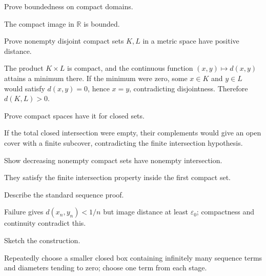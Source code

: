\begin{problem}\label{prob:ii06-problem-05}
Prove boundedness on compact domains.
\end{problem}
\begin{solution}
The compact image in $\mathbb R$ is bounded.
\end{solution}

\begin{problem}\label{prob:ii06-problem-06}
Prove nonempty disjoint compact sets $K,L$ in a metric space have positive distance.
\end{problem}
\begin{solution}
The product $K\times L$ is compact, and the continuous function $(x,y)\mapsto d(x,y)$ attains a minimum there. If the minimum were zero, some $x\in K$ and $y\in L$ would satisfy $d(x,y)=0$, hence $x=y$, contradicting disjointness. Therefore $d(K,L)>0$.
\end{solution}

\begin{problem}\label{prob:ii06-problem-07}
Prove compact spaces have it for closed sets.
\end{problem}
\begin{solution}
If the total closed intersection were empty, their complements would give an open cover with a finite subcover, contradicting the finite intersection hypothesis.
\end{solution}

\begin{problem}\label{prob:ii06-problem-08}
Show decreasing nonempty compact sets have nonempty intersection.
\end{problem}
\begin{solution}
They satisfy the finite intersection property inside the first compact set.
\end{solution}

\begin{problem}\label{prob:ii06-problem-09}
Describe the standard sequence proof.
\end{problem}
\begin{solution}
Failure gives $d(x_n,y_n)<1/n$ but image distance at least $\varepsilon_0$; compactness and continuity contradict this.
\end{solution}

\begin{problem}\label{prob:ii06-problem-10}
Sketch the construction.
\end{problem}
\begin{solution}
Repeatedly choose a smaller closed box containing infinitely many sequence terms and diameters tending to zero; choose one term from each stage.
\end{solution}

